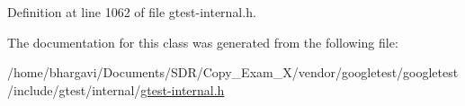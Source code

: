 Definition at line 1062 of file gtest-\/internal.\+h.



The documentation for this class was generated from the following file\+:\begin{DoxyCompactItemize}
\item 
/home/bhargavi/\+Documents/\+S\+D\+R/\+Copy\+\_\+\+Exam\+\_\+X/vendor/googletest/googletest/include/gtest/internal/\hyperlink{gtest-internal_8h}{gtest-\/internal.\+h}\end{DoxyCompactItemize}
